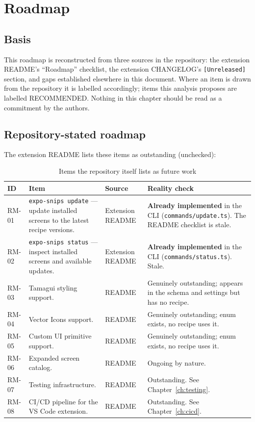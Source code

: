 \chapter{Roadmap}
\label{ch:roadmap}

\section{Basis}

This roadmap is reconstructed from three sources in the repository: the
extension README's ``Roadmap'' checklist, the extension CHANGELOG's
\texttt{[Unreleased]} section, and gaps established elsewhere in this document.
Where an item is drawn from the repository it is labelled accordingly; items
this analysis proposes are labelled RECOMMENDED. Nothing in this chapter should
be read as a commitment by the authors.

\section{Repository-stated roadmap}

The extension README lists these items as outstanding (unchecked):

\begin{longtable}{p{1.4cm}p{5.4cm}p{2.4cm}p{5.2cm}}
\caption{Items the repository itself lists as future work}\\
\toprule
\textbf{ID} & \textbf{Item} & \textbf{Source} & \textbf{Reality check} \\
\midrule

RM-01 & \texttt{expo-snips update} --- update installed screens to the latest
recipe versions. & Extension README & \textbf{Already implemented} in the CLI
(\texttt{commands/update.ts}). The README checklist is stale. \\
RM-02 & \texttt{expo-snips status} --- inspect installed screens and available
updates. & Extension README & \textbf{Already implemented} in the CLI
(\texttt{commands/status.ts}). Stale. \\
RM-03 & Tamagui styling support. & README & Genuinely outstanding; appears in the
schema and settings but has no recipe. \\
RM-04 & Vector Icons support. & README & Genuinely outstanding; enum exists, no
recipe uses it. \\
RM-05 & Custom UI primitive support. & README & Genuinely outstanding; enum
exists, no recipe uses it. \\
RM-06 & Expanded screen catalog. & README & Ongoing by nature. \\
RM-07 & Testing infrastructure. & README & Outstanding. See
Chapter~\ref{ch:testing}. \\
RM-08 & CI/CD pipeline for the VS Code extension. & README & Outstanding. See
Chapter~\ref{ch:cicd}. \\
\bottomrule
\end{longtable}

